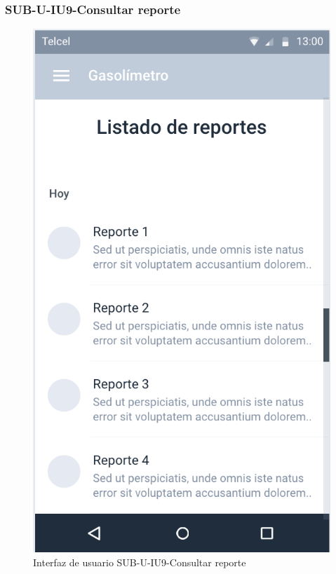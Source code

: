 \subsubsection{SUB-U-IU9-Consultar reporte}\label{SUB-U-IU9}
\begin{figure}[H]
	\centering
	\includegraphics[scale=1]{Capitulo4/software/submodulos/usuarios/images/sub-u-iu9}
	\caption{Interfaz de usuario SUB-U-IU9-Consultar reporte}
	\label{fig:sub-u-iu9}
\end{figure}